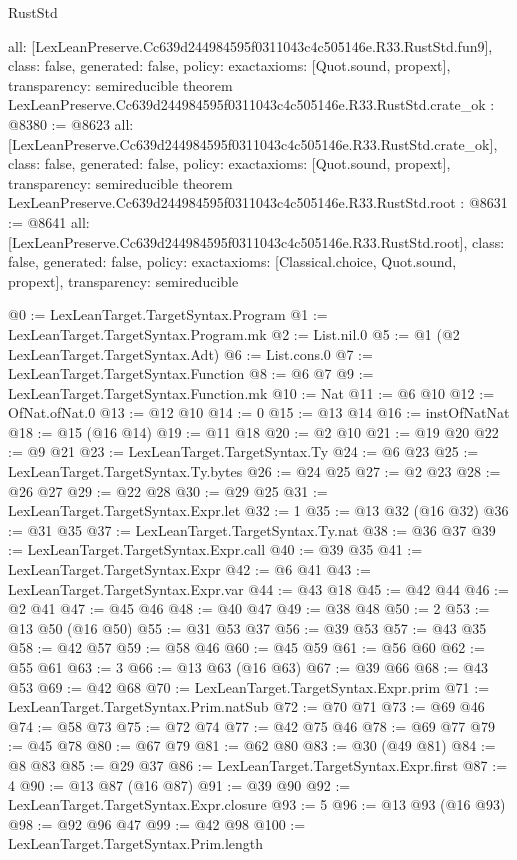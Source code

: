 \begin{lexlean}{RustStd}
\begin{coremodule}
{  all: [LexLeanPreserve.Cc639d244984595f0311043c4c505146e.R33.RustStd.fun9],
  class: false,
  generated: false,
  policy: exact{axioms: [Quot.sound, propext]},
  transparency: semireducible
}
theorem LexLeanPreserve.Cc639d244984595f0311043c4c505146e.R33.RustStd.crate_ok : @8380 := @8623 {
  all: [LexLeanPreserve.Cc639d244984595f0311043c4c505146e.R33.RustStd.crate_ok],
  class: false,
  generated: false,
  policy: exact{axioms: [Quot.sound, propext]},
  transparency: semireducible
}
theorem LexLeanPreserve.Cc639d244984595f0311043c4c505146e.R33.RustStd.root : @8631 := @8641 {
  all: [LexLeanPreserve.Cc639d244984595f0311043c4c505146e.R33.RustStd.root],
  class: false,
  generated: false,
  policy: exact{axioms: [Classical.choice, Quot.sound, propext]},
  transparency: semireducible
}

@0 := LexLeanTarget.TargetSyntax.Program
@1 := LexLeanTarget.TargetSyntax.Program.mk
@2 := List.nil.{0}
@5 := @1 (@2 LexLeanTarget.TargetSyntax.Adt)
@6 := List.cons.{0}
@7 := LexLeanTarget.TargetSyntax.Function
@8 := @6 @7
@9 := LexLeanTarget.TargetSyntax.Function.mk
@10 := Nat
@11 := @6 @10
@12 := OfNat.ofNat.{0}
@13 := @12 @10
@14 := 0
@15 := @13 @14
@16 := instOfNatNat
@18 := @15 (@16 @14)
@19 := @11 @18
@20 := @2 @10
@21 := @19 @20
@22 := @9 @21
@23 := LexLeanTarget.TargetSyntax.Ty
@24 := @6 @23
@25 := LexLeanTarget.TargetSyntax.Ty.bytes
@26 := @24 @25
@27 := @2 @23
@28 := @26 @27
@29 := @22 @28
@30 := @29 @25
@31 := LexLeanTarget.TargetSyntax.Expr.let
@32 := 1
@35 := @13 @32 (@16 @32)
@36 := @31 @35
@37 := LexLeanTarget.TargetSyntax.Ty.nat
@38 := @36 @37
@39 := LexLeanTarget.TargetSyntax.Expr.call
@40 := @39 @35
@41 := LexLeanTarget.TargetSyntax.Expr
@42 := @6 @41
@43 := LexLeanTarget.TargetSyntax.Expr.var
@44 := @43 @18
@45 := @42 @44
@46 := @2 @41
@47 := @45 @46
@48 := @40 @47
@49 := @38 @48
@50 := 2
@53 := @13 @50 (@16 @50)
@55 := @31 @53 @37
@56 := @39 @53
@57 := @43 @35
@58 := @42 @57
@59 := @58 @46
@60 := @45 @59
@61 := @56 @60
@62 := @55 @61
@63 := 3
@66 := @13 @63 (@16 @63)
@67 := @39 @66
@68 := @43 @53
@69 := @42 @68
@70 := LexLeanTarget.TargetSyntax.Expr.prim
@71 := LexLeanTarget.TargetSyntax.Prim.natSub
@72 := @70 @71
@73 := @69 @46
@74 := @58 @73
@75 := @72 @74
@77 := @42 @75 @46
@78 := @69 @77
@79 := @45 @78
@80 := @67 @79
@81 := @62 @80
@83 := @30 (@49 @81)
@84 := @8 @83
@85 := @29 @37
@86 := LexLeanTarget.TargetSyntax.Expr.first
@87 := 4
@90 := @13 @87 (@16 @87)
@91 := @39 @90
@92 := LexLeanTarget.TargetSyntax.Expr.closure
@93 := 5
@96 := @13 @93 (@16 @93)
@98 := @92 @96 @47
@99 := @42 @98
@100 := LexLeanTarget.TargetSyntax.Prim.length

\end{coremodule}
\end{lexlean}
